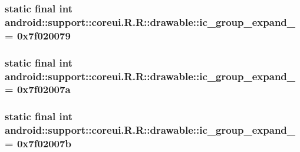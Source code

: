 \hypertarget{classandroid_1_1support_1_1coreui_1_1_r_1_1drawable_b0e91ba62140b29eb5ddac8c3a5cf056}{
\subsubsection[{ic\_\-group\_\-expand\_\-10}]{\setlength{\rightskip}{0pt plus 5cm}static final int android::support::coreui.R.R::drawable::ic\_\-group\_\-expand\_ = 0x7f020079}}
\label{classandroid_1_1support_1_1coreui_1_1_r_1_1drawable_b0e91ba62140b29eb5ddac8c3a5cf056}


\hypertarget{classandroid_1_1support_1_1coreui_1_1_r_1_1drawable_12b940b06463db4e51afa73682682b07}{
\subsubsection[{ic\_\-group\_\-expand\_\-11}]{\setlength{\rightskip}{0pt plus 5cm}static final int android::support::coreui.R.R::drawable::ic\_\-group\_\-expand\_ = 0x7f02007a}}
\label{classandroid_1_1support_1_1coreui_1_1_r_1_1drawable_12b940b06463db4e51afa73682682b07}


\hypertarget{classandroid_1_1support_1_1coreui_1_1_r_1_1drawable_52305ad8eefbf6149a44d8266d1d8cc7}{
\subsubsection[{ic\_\-group\_\-expand\_\-12}]{\setlength{\rightskip}{0pt plus 5cm}static final int android::support::coreui.R.R::drawable::ic\_\-group\_\-expand\_ = 0x7f02007b}}
\label{classandroid_1_1support_1_1coreui_1_1_r_1_1drawable_52305ad8eefbf6149a44d8266d1d8cc7}


